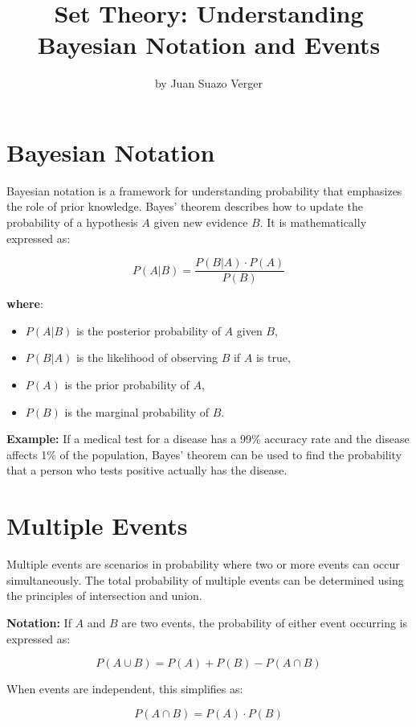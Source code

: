 \documentclass{article}
\title{Set Theory: Understanding Bayesian Notation and Events}
\author{by Juan Suazo Verger}
\date{}
\begin{document}
\maketitle

\newpage
\section{Bayesian Notation}
Bayesian notation is a framework for understanding probability that emphasizes the role of prior knowledge. Bayes' theorem describes how to update the probability of a hypothesis \(A\) given new evidence \(B\). It is mathematically expressed as:

\[
P(A|B) = \frac{P(B|A) \cdot P(A)}{P(B)}
\]

\textbf{where}:
\begin{itemize}
    \item \(P(A|B)\) is the posterior probability of \(A\) given \(B\),
    \item \(P(B|A)\) is the likelihood of observing \(B\) if \(A\) is true,
    \item \(P(A)\) is the prior probability of \(A\),
    \item \(P(B)\) is the marginal probability of \(B\).
\end{itemize}

\vspace{1em}
\textbf{Example:} If a medical test for a disease has a 99\% accuracy rate and the disease affects 1\% of the population, Bayes' theorem can be used to find the probability that a person who tests positive actually has the disease.

\newpage

\section{Multiple Events}
Multiple events are scenarios in probability where two or more events can occur simultaneously. The total probability of multiple events can be determined using the principles of intersection and union.

\vspace{1em}
\textbf{Notation:} If \(A\) and \(B\) are two events, the probability of either event occurring is expressed as:

\[
P(A \cup B) = P(A) + P(B) - P(A \cap B)
\]

When events are independent, this simplifies as:

\[
P(A \cap B) = P(A) \cdot P(B)
\]
\end{document}
